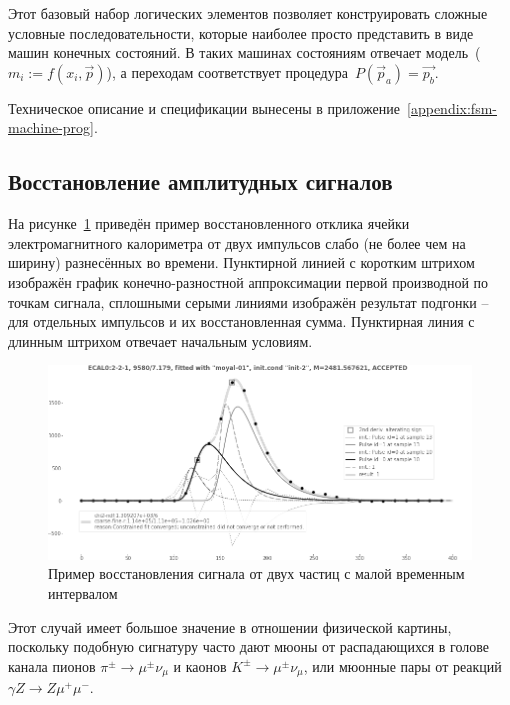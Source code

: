 Этот базовый набор логических элементов позволяет конструировать сложные
условные последовательности, которые наиболее просто представить в виде
машин конечных состояний. В таких машинах состояниям отвечает
модель~($m_i:=f(x_i,\vec{p})$),
а переходам соответствует процедура~$P(\vec{p}_a) = \vec{p_b}$.

Техническое описание и спецификации вынесены в приложение~\ref{appendix:fsm-machine-prog}.

\subsection{Восстановление амплитудных сигналов}

На рисунке~\ref{fig:sadc-wf-fitting-example} приведён пример
восстановленного отклика ячейки электромагнитного калориметра от двух
импульсов слабо (не более чем на ширину) разнесённых во времени.
Пунктирной линией с коротким штрихом
изображён график конечно-разностной аппроксимации первой производной
по точкам сигнала, сплошными серыми линиями изображён результат
подгонки -- для отдельных импульсов и их восстановленная сумма.
Пунктирная линия с длинным штрихом отвечает начальным условиям.

\begin{figure}[ht]
    \centering
    \includegraphics[width=0.99\linewidth]{images//illustrative/waveform-fit-result-example.png}
    \caption{Пример восстановления сигнала от двух частиц с малой временным
    интервалом}
    \label{fig:sadc-wf-fitting-example}
\end{figure}

Этот случай имеет большое значение в отношении физической картины,
поскольку подобную сигнатуру часто дают мюоны от
распадающихся в голове канала
пионов $\pi^{\pm} \rightarrow \mu^{\pm} \nu_\mu$ 
и каонов $K^{\pm} \rightarrow \mu^{\pm} \nu_\mu$,
или мюонные пары от реакций $\gamma Z \rightarrow Z \mu^{+}\mu^{-}$.

